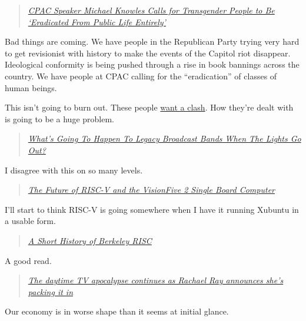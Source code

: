 \begin{quote}
\emph{\href{https://daringfireball.net/linked/2023/03/06/cpan-knowles-nazi}{CPAC
Speaker Michael Knowles Calls for Transgender People to Be `Eradicated
From Public Life Entirely'}}
\end{quote}

Bad things are coming. We have people in the Republican Party trying
very hard to get revisionist with history to make the events of the
Capitol riot disappear. Ideological conformity is being pushed through a
rise in book bannings across the country. We have people at CPAC calling
for the ``eradication'' of classes of human beings.

This isn't going to burn out. These people
\href{https://scrippsnews.com/stories/donald-trump-tells-cpac-crowd-i-am-your-retribution/}{want
a clash}. How they're dealt with is going to be a huge problem.

\begin{quote}
\emph{\href{https://hackaday.com/2023/03/06/whats-going-to-happen-to-legacy-broadcast-bands-when-the-lights-go-out/}{What's
Going To Happen To Legacy Broadcast Bands When The Lights Go Out?}}
\end{quote}

I disagree with this on so many levels.

\begin{quote}
\emph{\href{https://hackaday.com/2023/03/06/the-future-of-risc-v-and-the-visionfive-2-single-board-computer/}{The
Future of RISC-V and the VisionFive 2 Single Board Computer}}
\end{quote}

I'll start to think RISC-V is going somewhere when I have it running
Xubuntu in a usable form.

\begin{quote}
\emph{\href{https://www.abortretry.fail/p/a-short-history-of-berkeley-risc}{A
Short History of Berkeley RISC}}
\end{quote}

A good read.

\begin{quote}
\emph{\href{https://www.avclub.com/the-daytime-tv-apocalypse-continues-as-rachael-ray-anno-1850187651}{The
daytime TV apocalypse continues as Rachael Ray announces she's packing
it in}}
\end{quote}

Our economy is in worse shape than it seems at initial glance.
